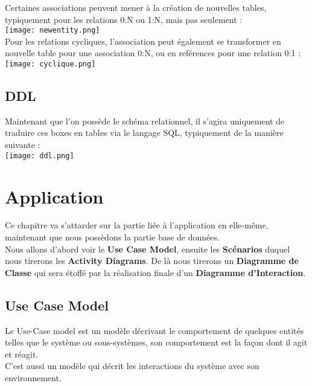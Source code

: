 \documentclass{report}
\begin{document}
			Certaines associations peuvent mener à la création de nouvelles tables, typiquement pour les relations 0:N ou 1:N, mais pas seulement : \\

			\texttt{[image: newentity.png]}\\

			Pour les relations cycliques, l'association peut également se transformer en nouvelle table pour une association 0:N, ou en reférences pour une relation 0:1 : \\

			\texttt{[image: cyclique.png]}\\

		\section{DDL}

			Maintenant que l'on possède le schéma relationnel, il s'agira uniquement de traduire ces boxes en tables via le langage SQL, typiquement de la manière suivante : \\

			\texttt{[image: ddl.png]}

\chapter{Application}

	Ce chapitre va s'attarder sur la partie liée à l'application en elle-même, maintenant que nous possèdons la partie base de données.\\

	Nous allons d'abord voir le \textbf{Use Case Model}, ensuite les \textbf{Scénarios} duquel nous tirerons les \textbf{Activity Diagrams}. De là nous tirerons un \textbf{Diagramme de Classe} qui sera étoffé par la réalisation finale d'un \textbf{Diagramme d'Interaction}.\\

	\section{Use Case Model}

		Le Use-Case model est un modèle décrivant le comportement de quelques entités telles que le système ou sous-systèmes, son comportement est la façon dont il agit et réagit.\\
		C'est aussi un modèle qui décrit les interactions du système avec son environnement.\\
\end{document}
